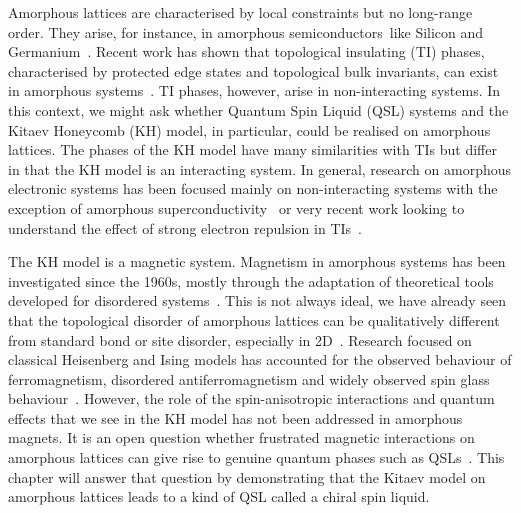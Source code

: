 Amorphous lattices are characterised by local constraints but no long-range order. They arise, for instance, in amorphous semiconductors~like Silicon and Germanium~\autocite{Yonezawa1983,zallen2008physics}. Recent work has shown that topological insulating (TI) phases, characterised by protected edge states and topological bulk invariants, can exist in amorphous systems~\autocite{mitchellAmorphousTopologicalInsulators2018,agarwala2019topological,marsalTopologicalWeaireThorpeModels2020,costa2019toward,agarwala2020higher,spring2021amorphous,corbae2019evidence}. TI phases, however, arise in non-interacting systems. In this context, we might ask whether Quantum Spin Liquid (QSL) systems and the Kitaev Honeycomb (KH) model, in particular, could be realised on amorphous lattices. The phases of the KH model have many similarities with TIs but differ in that the KH model is an interacting system. In general, research on amorphous electronic systems has been focused mainly on non-interacting systems with the exception of amorphous superconductivity~\autocite{buckel1954einfluss,mcmillan1981electron,meisel1981eliashberg,bergmann1976amorphous,mannaNoncrystallineTopologicalSuperconductors2022} or very recent work looking to understand the effect of strong electron repulsion in TIs~\autocite{kim2022fractionalization}.

The KH model is a magnetic system. Magnetism in amorphous systems has been investigated since the 1960s, mostly through the adaptation of theoretical tools developed for disordered systems~\autocite{aharony1975critical,Petrakovski1981,kaneyoshi1992introduction,Kaneyoshi2018}. This is not always ideal, we have already seen that the topological disorder of amorphous lattices can be qualitatively different from standard bond or site disorder, especially in 2D~\autocite{barghathiPhaseTransitionsRandom2014,schrauthViolationHarrisBarghathiVojtaCriterion2018}. Research focused on classical Heisenberg and Ising models has accounted for the observed behaviour of ferromagnetism, disordered antiferromagnetism and widely observed spin glass behaviour~\autocite{coey1978amorphous}. However, the role of the spin-anisotropic interactions and quantum effects that we see in the KH model has not been addressed in amorphous magnets. It is an open question whether frustrated magnetic interactions on amorphous lattices can give rise to genuine quantum phases such as QSLs~\autocite{Anderson1973,Knolle2019,Savary2016,Lacroix2011}. This chapter will answer that question by demonstrating that the Kitaev model on amorphous lattices leads to a kind of QSL called a chiral spin liquid.

